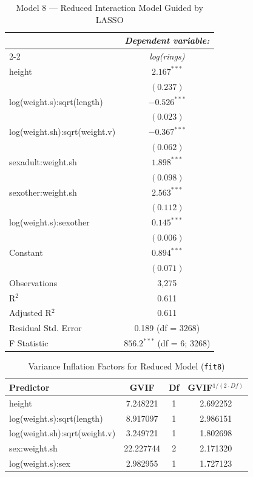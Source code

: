 \documentclass[12pt]{article}
\begin{document}
	\begin{table}[H]
		\centering
		\caption{Model 8 --- Reduced Interaction Model Guided by LASSO}
		\label{tab:fit8}
		\begin{tabular}{lc}
			\toprule
			& \textit{Dependent variable:} \\
			\cline{2-2}
			& \textit{log(rings)} \\
			\midrule
			height & $2.167^{***}$ \\
			& $(0.237)$ \\[0.5em]
			
			log(weight.s):sqrt(length) & $-0.526^{***}$ \\
			& $(0.023)$ \\[0.5em]
			
			log(weight.sh):sqrt(weight.v) & $-0.367^{***}$ \\
			& $(0.062)$ \\[0.5em]
			
			sexadult:weight.sh & $1.898^{***}$ \\
			& $(0.098)$ \\[0.5em]
			
			sexother:weight.sh & $2.563^{***}$ \\
			& $(0.112)$ \\[0.5em]
			
			log(weight.s):sexother & $0.145^{***}$ \\
			& $(0.006)$ \\[0.5em]
			
			Constant & $0.894^{***}$ \\
			& $(0.071)$ \\
			\midrule
			Observations & 3,275 \\
			R$^2$ & 0.611 \\
			Adjusted R$^2$ & 0.611 \\
			Residual Std. Error & 0.189 (df = 3268) \\
			F Statistic & $856.2^{***}$ (df = 6; 3268) \\
			\bottomrule
		\end{tabular}
	\end{table}
	
	
	\begin{table}[!h]
		\centering
		\caption{Variance Inflation Factors for Reduced Model (\texttt{fit8})}
		\label{tab:vif_fit8}
		\begin{tabular}{lccc}
			\toprule
			\textbf{Predictor} & \textbf{GVIF} & \textbf{Df} & \textbf{GVIF}$^{1/(2\cdot {Df})}$ \\
			\midrule
			height                         & 7.248221  & 1 & 2.692252 \\
			log(weight.s):sqrt(length)  & 8.917097  & 1 & 2.986151 \\
			log(weight.sh):sqrt(weight.v) & 3.249721  & 1 & 1.802698 \\
			sex:weight.sh                & 22.227744 & 2 & 2.171320 \\
			log(weight.s):sex        & 2.982955  & 1 & 1.727123 \\
			\bottomrule
		\end{tabular}
	\end{table}
\end{document}
